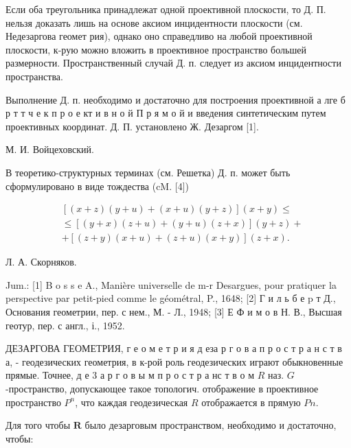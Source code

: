 \documentclass[10pt]{article}
\begin{document}
Если оба треугольника принадлежат одной проективной плоскости, то Д. П. нельзя доказать лишь на основе аксиом инцидентности плоскости (см. Недезаргова геомет рия), однако оно справедливо на любой проективной плоскости, к-рую можно вложить в проективное пространство большей размерности. Пространственный случай Д. п. следует из аксиом инцидентности пространства.



Выполнение Д. п. необходимо и достаточно для построения проективной а лге б р т т ч е к п р о е кт и в н о й П р я м о й и введения синтетическим путем проективных координат. Д. П. установлено Ж. Дезаргом [1].



М. И. Войцеховский.



В теоретико-структурных терминах (см. Решетка) Д. п. может быть сформулировано в виде тождества (cM. [4])



\[

\begin{aligned}

& {[(x+z)(y+u)+(x+u)(y+z)](x+y) \leqslant} \\

& \leqslant[(y+x)(z+u)+(y+u)(z+x)](y+z)+ \\

& +[(z+y)(x+u)+(z+u)(x+y)](z+x) .

\end{aligned}

\]



Л. А. Скорняков.



Jum.: [1] B o s s e A., Manière universelle de m-r Desargues, pour pratiquer la perspective par petit-pied comme le géométral, P., 1648; [2] Г и л ь б е p т Д., Основания геометрии, пер. с нем., М. - Л., 1948; [3] Е Ф и м о в Н. В., Высшая геотур, пер. с англ., і., 1952.



ДЕЗАРГОВА ГЕОМЕТРИЯ, $г$ е о м е т р и я д еза р г о в а п р о с т р а н с т в а, - геодезических геометрия, в к-рой роль геодезических играют обыкновенные прямые. Точнее, д е 3 а р г о в ы м п р о с т р а нс т в о м $R$ наз. $G$-пространство, допускающее такое топологич. отображение в проективное пространство $P^{n}$, что каждая геодезическая $R$ отображается в прямую $P n$.



Для того чтобы $\boldsymbol{R}$ было дезарговым пространством, необходимо и достаточно, чтобы:
\end{document}
